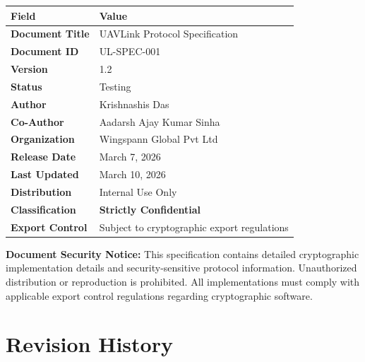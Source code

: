 \documentclass[11pt,a4paper]{article}
\begin{document}
\begin{table}[H]
\renewcommand{\arraystretch}{1.5}
\begin{tabularx}{\textwidth}{@{}lX@{}}
\toprule
\textbf{Field} & \textbf{Value} \\
\midrule
\textbf{Document Title} & UAVLink Protocol Specification \\
\textbf{Document ID} & UL-SPEC-001 \\
\textbf{Version} & 1.2 \\
\textbf{Status} & Testing \\
\midrule
\textbf{Author} & Krishnashis Das \\
\textbf{Co-Author} & Aadarsh Ajay Kumar Sinha \\
\textbf{Organization} & Wingspann Global Pvt Ltd \\
\midrule
\textbf{Release Date} & March 7, 2026 \\
\textbf{Last Updated} & March 10, 2026 \\
\midrule
\textbf{Distribution} & Internal Use Only \\
\textbf{Classification} & \textcolor{alertred}{\textbf{Strictly Confidential}} \\
\textbf{Export Control} & Subject to cryptographic export regulations \\
\bottomrule
\end{tabularx}
\end{table}

\vspace{1cm}

\begin{alertbox}
\textbf{Document Security Notice:} This specification contains detailed cryptographic implementation details and security-sensitive protocol information. Unauthorized distribution or reproduction is prohibited. All implementations must comply with applicable export control regulations regarding cryptographic software.
\end{alertbox}

\newpage
\section*{Revision History}
\end{document}
